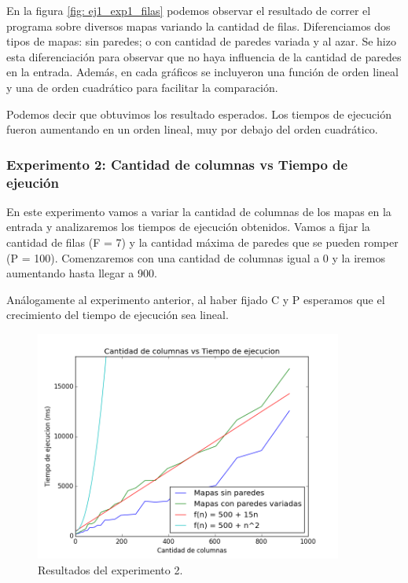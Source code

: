 \par En la figura \ref{fig: ej1_exp1_filas} podemos observar el resultado de correr el programa sobre diversos mapas variando la cantidad de filas. Diferenciamos dos tipos de mapas: sin paredes; o con cantidad de paredes variada y al azar. Se hizo esta diferenciación para observar que no haya influencia de la cantidad de paredes en la entrada. Además, en cada gráficos se incluyeron una función de orden lineal y una de orden cuadrático para facilitar la comparación.

\par Podemos decir que obtuvimos los resultado esperados. Los tiempos de ejecución fueron aumentando en un orden lineal, muy por debajo del orden cuadrático.


\subsubsection{Experimento 2: Cantidad de columnas vs Tiempo de ejeución}

\par En este experimento vamos a variar la cantidad de columnas de los mapas en la entrada y analizaremos los tiempos de ejecución obtenidos. Vamos a fijar la cantidad de filas (F = 7) y la cantidad máxima de paredes que se pueden romper (P = 100). Comenzaremos con una cantidad de columnas igual a 0 y la iremos aumentando hasta llegar a 900.

\par Análogamente al experimento anterior, al haber fijado C y P esperamos que el crecimiento del tiempo de ejecución sea lineal.

\begin{figure}[H]
	\centering
	\includegraphics[width=0.9\textwidth]{Problema1/img/exp2_columnas.png}
	\caption{Resultados del experimento 2.}
	\label{fig: ej1_exp2_columnas}
\end{figure}

